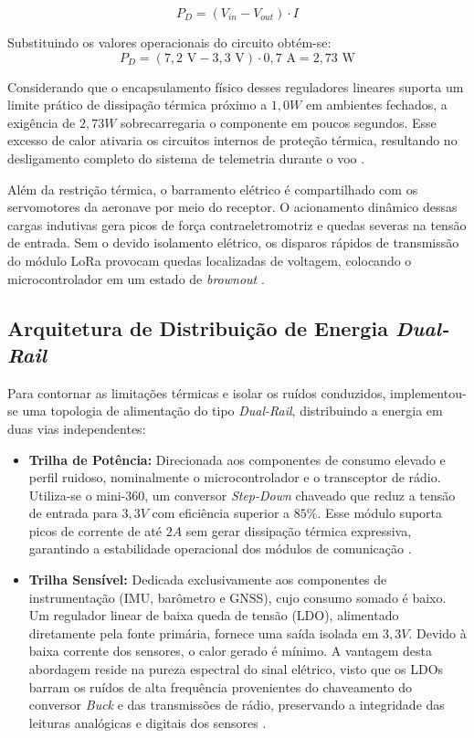 \begin{equation}
  P_D = (V_{in} - V_{out}) \cdot I
  \label{eq:lei_jaule}
\end{equation}

Substituindo os valores operacionais do circuito obtém-se:
$$P_D = (7,2\text{ V} - 3,3\text{ V}) \cdot 0,7\text{ A} = 2,73\text{ W}$$

Considerando que o encapsulamento físico desses reguladores lineares suporta um limite prático de dissipação térmica próximo a $1,0 W$ em ambientes fechados, a exigência de $2,73 W$ sobrecarregaria o componente em poucos segundos. Esse excesso de calor ativaria os circuitos internos de proteção térmica, resultando no desligamento completo do sistema de telemetria durante o voo \cite{the_art_of_electronics}.

Além da restrição térmica, o barramento elétrico é compartilhado com os servomotores da aeronave por meio do receptor. O acionamento dinâmico dessas cargas indutivas gera picos de força contraeletromotriz e quedas severas na tensão de entrada. Sem o devido isolamento elétrico, os disparos rápidos de transmissão do módulo LoRa provocam quedas localizadas de voltagem, colocando o microcontrolador em um estado de \textit{brownout} \cite{the_art_of_electronics}.

\subsection{Arquitetura de Distribuição de Energia \textit{Dual-Rail}}

Para contornar as limitações térmicas e isolar os ruídos conduzidos, implementou-se uma topologia de alimentação do tipo \textit{Dual-Rail}, distribuindo a energia em duas vias independentes:

\begin{itemize}
  \item{\textbf{Trilha de Potência:} Direcionada aos componentes de consumo elevado e perfil ruidoso, nominalmente o microcontrolador e o transceptor de rádio. Utiliza-se o mini-360, um conversor \textit{Step-Down} chaveado que reduz a tensão de entrada para $3,3 V$ com eficiência superior a $85\%$. Esse módulo suporta picos de corrente de até $2 A$ sem gerar dissipação térmica expressiva, garantindo a estabilidade operacional dos módulos de comunicação \cite{mini360_datasheet}.}
  \item{\textbf{Trilha Sensível:} Dedicada exclusivamente aos componentes de instrumentação (IMU, barômetro e GNSS), cujo consumo somado é baixo. Um regulador linear de baixa queda de tensão (LDO), alimentado diretamente pela fonte primária, fornece uma saída isolada em $3,3 V$. Devido à baixa corrente dos sensores, o calor gerado é mínimo. A vantagem desta abordagem reside na pureza espectral do sinal elétrico, visto que os LDOs barram os ruídos de alta frequência provenientes do chaveamento do conversor \textit{Buck} e das transmissões de rádio, preservando a integridade das leituras analógicas e digitais dos sensores \cite{the_art_of_electronics}.}
\end{itemize}


